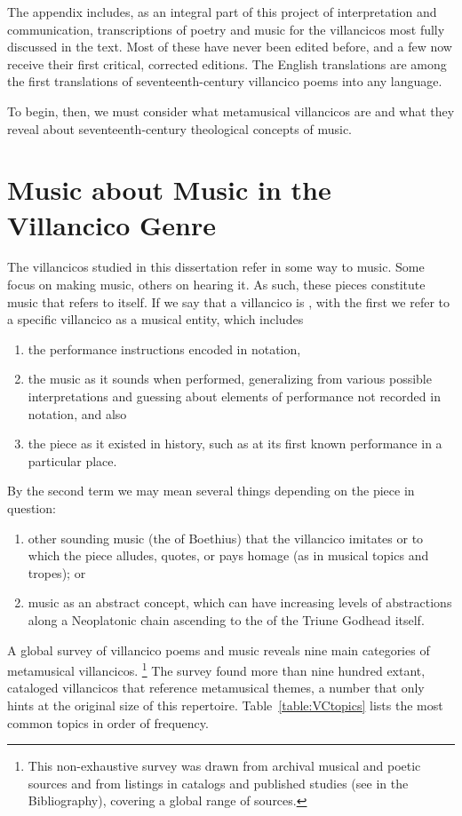 The appendix includes, as an integral part of this project of interpretation and communication, transcriptions of poetry and music for the villancicos most fully discussed in the text.
Most of these have never been edited before, and a few now receive their first critical, corrected editions.
The English translations are among the first translations of seventeenth-century villancico poems into any language.

To begin, then, we must consider what metamusical villancicos are and what they reveal about seventeenth-century theological concepts of music.

\section{%
Music about Music in the Villancico Genre
}

The villancicos studied in this dissertation refer in some way to music.
Some focus on making music, others on hearing it.
As such, these pieces constitute music that refers to itself.
If we say that a villancico is , with the first  we refer to a specific villancico as a musical entity, which includes 
\begin{enumerate}
\item the performance instructions encoded in notation,
\item the music as it sounds when performed, generalizing from various possible interpretations and guessing about elements of performance not recorded in notation, and also
\item the piece as it existed in history, such as at its first known performance in a particular place.
\end{enumerate}
%
By the second term  we may mean several things depending on the piece in question: 
\begin{enumerate}
\item other sounding music (the  of Boethius) that the villancico imitates or to which the piece alludes, quotes, or pays homage (as in musical topics and tropes); or 
\item music as an abstract concept, which can have increasing levels of abstractions along a Neoplatonic chain ascending to the  of the Triune Godhead itself.
\end{enumerate}

A global survey of villancico poems and music reveals nine main categories of metamusical villancicos.%
	\footnote{%
	This non-exhaustive survey was drawn from archival musical and poetic sources and from listings in catalogs and published studies (see  in the Bibliography), covering a global range of sources.
	}
The survey found more than nine hundred extant, cataloged villancicos that reference metamusical themes, a number that only hints at the original size of this repertoire.
Table~\ref{table:VCtopics} lists the most common topics in order of frequency.

